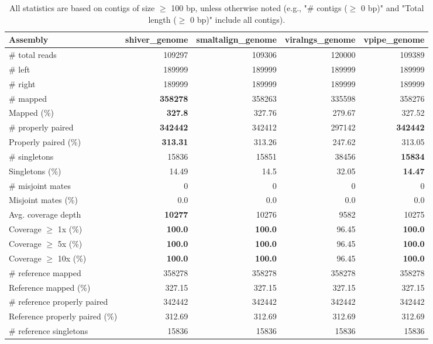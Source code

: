 \documentclass[12pt,a4paper]{article}
\begin{document}
\begin{table}[ht]
\begin{center}
\caption{All statistics are based on contigs of size $\geq$ 100 bp, unless otherwise noted (e.g., "\# contigs ($\geq$ 0 bp)" and "Total length ($\geq$ 0 bp)" include all contigs).}
\begin{tabular}{|l*{4}{|r}|}
\hline
Assembly & shiver\_genome & smaltalign\_genome & viralngs\_genome & vpipe\_genome \\ \hline
\# total reads & 109297 & 109306 & 120000 & 109389 \\ \hline
\# left & 189999 & 189999 & 189999 & 189999 \\ \hline
\# right & 189999 & 189999 & 189999 & 189999 \\ \hline
\# mapped & {\bf 358278} & 358263 & 335598 & 358276 \\ \hline
Mapped (\%) & {\bf 327.8} & 327.76 & 279.67 & 327.52 \\ \hline
\# properly paired & {\bf 342442} & 342412 & 297142 & {\bf 342442} \\ \hline
Properly paired (\%) & {\bf 313.31} & 313.26 & 247.62 & 313.05 \\ \hline
\# singletons & 15836 & 15851 & 38456 & {\bf 15834} \\ \hline
Singletons (\%) & 14.49 & 14.5 & 32.05 & {\bf 14.47} \\ \hline
\# misjoint mates & 0 & 0 & 0 & 0 \\ \hline
Misjoint mates (\%) & 0.0 & 0.0 & 0.0 & 0.0 \\ \hline
Avg. coverage depth & {\bf 10277} & 10276 & 9582 & 10275 \\ \hline
Coverage $\geq$ 1x (\%) & {\bf 100.0} & {\bf 100.0} & 96.45 & {\bf 100.0} \\ \hline
Coverage $\geq$ 5x (\%) & {\bf 100.0} & {\bf 100.0} & 96.45 & {\bf 100.0} \\ \hline
Coverage $\geq$ 10x (\%) & {\bf 100.0} & {\bf 100.0} & 96.45 & {\bf 100.0} \\ \hline
\# reference mapped & 358278 & 358278 & 358278 & 358278 \\ \hline
Reference mapped (\%) & 327.15 & 327.15 & 327.15 & 327.15 \\ \hline
\# reference properly paired & 342442 & 342442 & 342442 & 342442 \\ \hline
Reference properly paired (\%) & 312.69 & 312.69 & 312.69 & 312.69 \\ \hline
\# reference singletons & 15836 & 15836 & 15836 & 15836 \\ \hline

\end{tabular}
\end{center}
\end{table}
\end{document}
